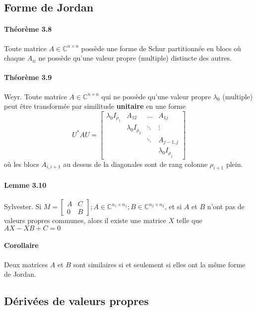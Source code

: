 \subsection{Forme de Jordan}
\paragraph{Théorème 3.8} Toute matrice $A \in \mathbb{C}^{n\times n}$ possède une forme de Schur partitionnée en blocs où chaque $A_{ii}$ ne possède qu'une valeur propre (multiple) distincte des autres.

\paragraph{Théorème 3.9} Weyr. Toute matrice $A \in \mathbb{C}^{n\times n}$ qui ne possède qu'une valeur propre $\lambda_0$ (multiple) peut être transformée par similitude \textbf{unitaire} en une forme
$$ U^*AU = \begin{bmatrix}
\lambda_0 I_{\rho_1} & A_{12} & \dots & A_{1j} \\
 & \lambda_0 I_{\rho_2} & \ddots & \vdots \\
 &  & \ddots & A_{j-1,j} \\
 &  &  & \lambda_0 I_{\rho_j}
\end{bmatrix} $$où les blocs $A_{i,i+1}$ au dessus de la diagonales sont de rang colonne $\rho_{i+1}$ plein.

\paragraph{Lemme 3.10} Sylvester. Si $M = \begin{bmatrix}
A & C \\
0 & B
\end{bmatrix} ; A\in \mathbb{C}^{n_1\times n_1} ; B \in \mathbb{C}^{n_2\times n_2}$, et si $A$ et $B$ n'ont pas de valeurs propres communes, alors il existe une matrice $X$ telle que $AX-XB+C =0$

\paragraph{Corollaire} Deux matrices $A$ et $B$ sont similaires si et seulement si elles ont la même forme de Jordan.

\subsection{Dérivées de valeurs propres}

